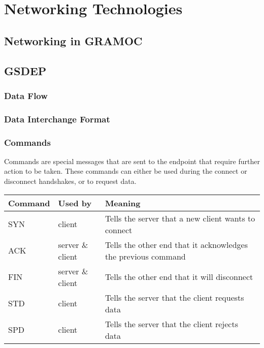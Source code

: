 \chapter{Networking Technologies}
\label{ch:networkingtechnologies}

\section{Networking in GRAMOC}

\section{GSDEP}

\subsection{Data Flow}

\subsection{Data Interchange Format}

\subsection{Commands}

Commands are special messages that are sent to the endpoint that require further action to be taken. These commands can either be used during the connect or disconnect handshakes, or to request data.

\begin{center}

	\begin{tabular}{| l | l | p{5cm} |}
	\hline
	\textbf{Command} & \textbf{Used by} & \textbf{Meaning} \\ \hline
	SYN & client & Tells the server that a new client wants to connect \\ \hline
	ACK & server \& client & Tells the other end that it acknowledges the previous command \\ \hline
	FIN & server \& client & Tells the other end that it will disconnect \\ \hline
	STD & client & Tells the server that the client requests data\\ \hline
	SPD & client & Tells the server that the client rejects data\\
	\hline
	\end{tabular}

\end{center}

